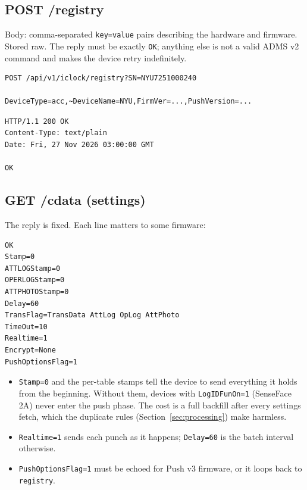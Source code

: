 \documentclass[11pt]{article}
\begin{document}
\subsection{POST /registry}
Body: comma-separated \texttt{key=value} pairs describing the hardware and firmware. Stored raw. The reply must be
exactly \texttt{OK}; anything else is not a valid ADMS v2 command and makes the device retry indefinitely.
\begin{lstlisting}
POST /api/v1/iclock/registry?SN=NYU7251000240

DeviceType=acc,~DeviceName=NYU,FirmVer=...,PushVersion=...
\end{lstlisting}
\begin{lstlisting}
HTTP/1.1 200 OK
Content-Type: text/plain
Date: Fri, 27 Nov 2026 03:00:00 GMT

OK
\end{lstlisting}

\subsection{GET /cdata (settings)}
The reply is fixed. Each line matters to some firmware:
\begin{lstlisting}
OK
Stamp=0
ATTLOGStamp=0
OPERLOGStamp=0
ATTPHOTOStamp=0
Delay=60
TransFlag=TransData AttLog OpLog AttPhoto
TimeOut=10
Realtime=1
Encrypt=None
PushOptionsFlag=1
\end{lstlisting}
\begin{itemize}[nosep]
  \item \texttt{Stamp=0} and the per-table stamps tell the device to send everything it holds from the beginning.
        Without them, devices with \texttt{LogIDFunOn=1} (SenseFace 2A) never enter the push phase. The cost is a full
        backfill after every settings fetch, which the duplicate rules (Section~\ref{sec:processing}) make harmless.
  \item \texttt{Realtime=1} sends each punch as it happens; \texttt{Delay=60} is the batch interval otherwise.
  \item \texttt{PushOptionsFlag=1} must be echoed for Push v3 firmware, or it loops back to \texttt{registry}.
\end{itemize}
\end{document}
